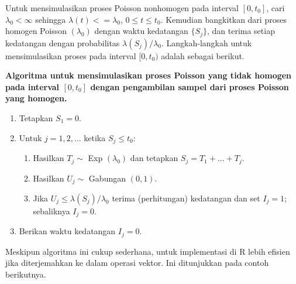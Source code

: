 \documentclass[a4paper,12pt]{article}
\theoremstyle{definition}
\begin{document}
Untuk mensimulasikan proses Poisson nonhomogen pada interval $ [0, t_0]$, cari $\lambda_0 < \infty$ sehingga $\lambda(t) <= \lambda_0$, $0 \leq t \leq t_0$. Kemudian bangkitkan dari proses homogen Poisson $(\lambda_0)$ dengan waktu kedatangan $\{S_j\}$, dan terima setiap kedatangan dengan probabilitas $\lambda (S_j)/\lambda_0$. Langkah-langkah untuk mensimulasikan proses pada interval $[0, t_0)$ adalah sebagai berikut.

\textbf{Algoritma untuk mensimulasikan proses Poisson yang tidak homogen pada interval $[0, t_0]$ dengan pengambilan sampel dari proses Poisson yang homogen.}
\begin{enumerate}
    \item Tetapkan $S_1 = 0$.
    \item Untuk $j = 1, 2, ...$ ketika $S_j \leq t_0$:
        \begin{enumerate}
            \item Hasilkan $T_j \sim $ Exp $(\lambda_0)$ dan tetapkan $S_j = T_1 + ... + T_j$.
            \item Hasilkan $U_j \sim $ Gabungan $(0, 1)$.
            \item Jika $U_j \leq \lambda (S_j)/\lambda_0$ terima (perhitungan) kedatangan dan set $I_j = 1$; sebaliknya $I_j = 0$.
        \end{enumerate}
    \item Berikan waktu kedatangan $I_j = 0$. 
\end{enumerate}

Meskipun algoritma ini cukup sederhana, untuk implementasi di R lebih efisien jika diterjemahkan ke dalam operasi vektor. Ini ditunjukkan pada contoh berikutnya.
\end{document}

